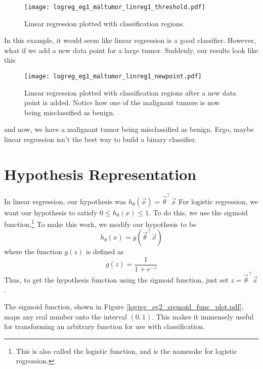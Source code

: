 \begin{figure}[h] 
	\centering
	\graphicspath{{./Figures/}} 
	\texttt{[image: logreg\_eg1\_maltumor\_linreg1\_threshold.pdf]} 
	\caption[]{Linear regression plotted with classification regions. }
	\label{logreg_eg1_maltumor_linreg1_threshold.pdf}
\end{figure}


In this example, it would seem like linear regression is a good classifier. However, what if we add a new data point for a large tumor. Suddenly, our results look like this

\begin{figure}[h] %
	\centering
	\graphicspath{{./Figures/}} %
	\texttt{[image: logreg\_eg1\_maltumor\_linreg1\_newpoint.pdf]} 
	\caption[]{Linear regression plotted with classification regions after a new data point is added. Notice how one of the malignant tumors is now being misclassified as benign.}
	\label{logreg_eg1_maltumor_linreg1_newpoint.pdf}
\end{figure}

and now, we have a malignant tumor being misclassified as benign. Ergo, maybe linear regression isn't the best way to build a binary classifier. 






\section{Hypothesis Representation}
In linear regression, our hypothesis was $h_\theta\left(\vec{x}\right) = \vec{\theta}^\intercal \vec{x}$ For logistic regression, we want our hypothesis to satisfy $0 \leq h_\theta\left(x\right) \leq 1$. To do this, we use the sigmoid function.\footnote{This is also called the logistic function, and is the namesake for logistic regression.} To make this work, we modify our hypothesis to be
\begin{equation}
h_\theta\left(x\right) = g\left(\vec{\theta}^\intercal \vec{x}\right)
\end{equation}
where the function $g\left(z\right)$ is defined as
\begin{equation}
g\left(z\right) = \frac{1}{1 + e^{-z}}
\end{equation}
Thus, to get the hypothesis function using the sigmoid function, just set $z = \vec{\theta}^\intercal \vec{x}$. 

The sigmoid function, shown in Figure \ref{logreg_eg2_sigmoid_func_plot.pdf}, maps any real number onto the interval $\left(0, 1\right)$. This makes it immensely useful for transforming an arbitrary function for use with classification.


